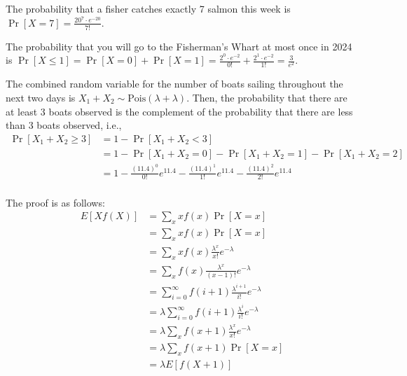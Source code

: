 \documentclass[11pt]{article}
\begin{document}
\begin{solution}
    
\begin{Parts}
    
\Part The probability that a fisher catches exactly 7 salmon this week is $\Pr[X=7]
= \frac{20^7 \cdot e^{-20}}{7!}$.

\Part The probability that you will go to the Fisherman's Whart at most once in
2024 is $\Pr[X \leq 1] = \Pr[X=0] + \Pr[X=1] = \frac{2^0 \cdot e^{-2}}{0!} + 
\frac{2^1 \cdot e^{-2}}{1!} = \frac{3}{e^2}$.

\Part The combined random variable for the number of boats sailing throughout 
the next two days is $X_1 + X_2 \sim \text{Pois}(\lambda + \lambda)$. Then, the
probability that there are at least 3 boats observed is the complement of the 
probability that there are less than 3 boats observed, i.e., 
\[
    \begin{split}
        \Pr[X_1 + X_2 \geq 3] &= 1 - \Pr[X_1 + X_2 < 3] \\
        &= 1 - \Pr[X_1 + X_2 = 0] - \Pr[X_1 + X_2 = 1] - \Pr[X_1 + X_2 = 2] \\
        &= 1 - \frac{(11.4)^0}{0!}e^{11.4} - \frac{(11.4)^1}{1!}e^{11.4} - \frac{(11.4)^2}{2!}e^{11.4} \\
    \end{split}
\]

\Part The proof is as follows:
\[
    \begin{split}
        E[Xf(X)] &= \sum_x x f(x) \Pr[X=x] \\
        &= \sum_x x f(x) \Pr[X=x] \\
        &= \sum_x x f(x) \frac{\lambda^x}{x!} e^{-\lambda} \\
        &= \sum_x f(x) \frac{\lambda^x}{(x-1)!} e^{-\lambda} \\
        &= \sum_{i=0}^{\infty} f(i+1) \frac{\lambda^{i+1}}{i!} e^{-\lambda} \\
        &= \lambda \sum_{i=0}^{\infty} f(i+1) \frac{\lambda^{i}}{i!} e^{-\lambda} \\
        &= \lambda \sum_x f(x+1) \frac{\lambda^{x}}{x!} e^{-\lambda} \\
        &= \lambda \sum_x f(x+1) \Pr[X=x] \\
        &= \lambda E[f(X+1)] \\
    \end{split}
\]

\end{Parts}

\end{solution}
\end{document}
